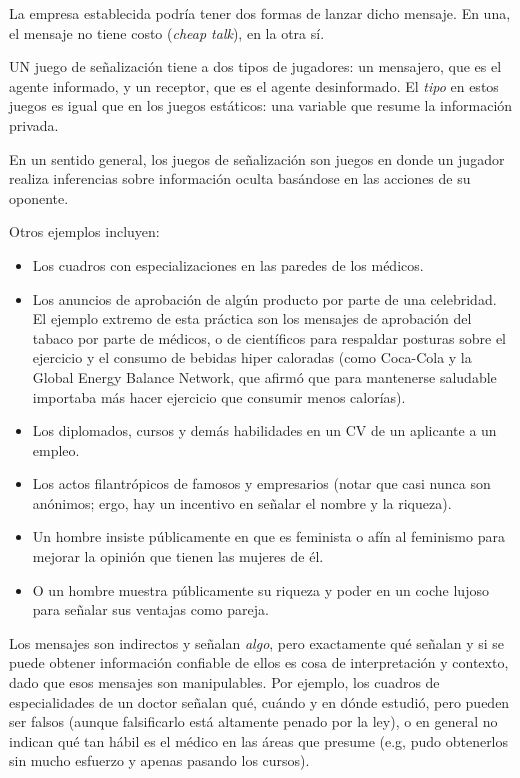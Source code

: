 \documentclass[12pt]{article}
\begin{document}
La empresa establecida podría tener dos formas de lanzar dicho mensaje. En una, el mensaje no tiene costo (\textit{cheap talk}), en la otra sí.

UN juego de señalización tiene a dos tipos de jugadores: un mensajero, que es el agente informado, y un receptor, que es el agente desinformado. El \textit{tipo} en estos juegos es igual que en los juegos estáticos: una variable que resume la información privada.

En un sentido general, los juegos de señalización son juegos en donde un jugador realiza inferencias sobre información oculta basándose en las acciones de su oponente.

Otros ejemplos incluyen:

\begin{itemize}
	\setlength{\itemsep}{0pt}
	\setlength{\parskip}{0pt}
	\setlength{\parsep}{0pt}
	\item Los cuadros con especializaciones en las paredes de los médicos.
	\item Los anuncios de aprobación de algún producto por parte de una celebridad. El ejemplo extremo de esta práctica son los mensajes de aprobación del tabaco por parte de médicos, o de científicos para respaldar posturas sobre el ejercicio y el consumo de bebidas hiper caloradas (como Coca-Cola y la Global Energy Balance Network, que afirmó que para mantenerse saludable importaba más hacer ejercicio que consumir menos calorías).
	\item Los diplomados, cursos y demás habilidades en un CV de un aplicante a un empleo.
	\item Los actos filantrópicos de famosos y empresarios (notar que casi nunca son anónimos; ergo, hay un incentivo en señalar el nombre y la riqueza).
	\item Un hombre insiste públicamente en que es feminista o afín al feminismo para mejorar la opinión que tienen las mujeres de él.
	\item O un hombre muestra públicamente su riqueza y poder en un coche lujoso para señalar sus ventajas como pareja.
\end{itemize}

Los mensajes son indirectos y señalan \textit{algo}, pero exactamente qué señalan y si se puede obtener información confiable de ellos es cosa de interpretación y contexto, dado que esos mensajes son manipulables. Por ejemplo, los cuadros de especialidades de un doctor señalan qué, cuándo y en dónde estudió, pero pueden ser falsos (aunque falsificarlo está altamente penado por la ley), o en general no indican qué tan hábil es el médico en las áreas que presume (e.g, pudo obtenerlos sin mucho esfuerzo y apenas pasando los cursos).
\end{document}

